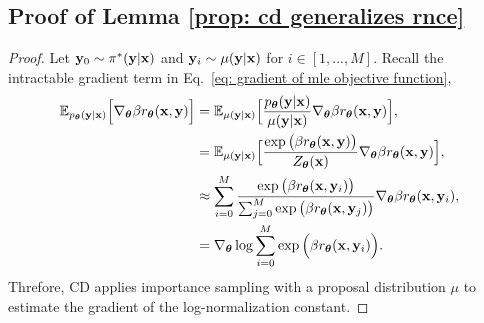 \subsection{Proof of Lemma \ref{prop: cd generalizes rnce}}
\label{sec: cd generalizes rnce}
\cdgeneralizernce*

\begin{proof}
Let $\mathbf{y}_0 \sim \pi^{\ast}(\mathbf{y} | \mathbf{x})$
and
$\mathbf{y}_i \sim \mu(\mathbf{y} | \mathbf{x})$ for $i \in [1,...,M]$.
Recall the intractable gradient term in Eq.~\eqref{eq: gradient of mle objective function},
\begin{align}
\label{eq: cd estimation gradient of log norm constant}
\mathbb{E}_{p_{\boldsymbol\theta}(\mathbf{y} | \mathbf{x})}
\Big[
\nabla_{\boldsymbol\theta} 
\beta
r_{\boldsymbol\theta}(\mathbf{x}, \mathbf{y})
\Big]
& =
\mathbb{E}_{\mu(\mathbf{y} | \mathbf{x})} 
\Big[
\frac{p_{\boldsymbol\theta}(\mathbf{y} | \mathbf{x})} {\mu(\mathbf{y} | \mathbf{x})} 
\nabla_{\boldsymbol\theta} 
\beta
r_{\boldsymbol\theta}(\mathbf{x}, \mathbf{y})
\Big],
\\ \nonumber
& =
\mathbb{E}_{\mu(\mathbf{y} | \mathbf{x})} 
\Big[
\frac{
\exp 
\big(
\beta
r_{\boldsymbol\theta}(\mathbf{x}, \mathbf{y})
\big)
}
{Z_{\boldsymbol\theta}(\mathbf{x})}
\nabla_{\boldsymbol\theta} 
\beta
r_{\boldsymbol\theta}(\mathbf{x}, \mathbf{y})
\Big],
\\ \nonumber
& \approx
\sum_{i=0}^M
\frac{\exp 
\big(
\beta
r_{\boldsymbol\theta}(\mathbf{x}, \mathbf{y}_i)
\big)}
{\sum_{j=0}^M \exp 
\big(
\beta
r_{\boldsymbol\theta}(\mathbf{x}, \mathbf{y}_j)
\big)}
\nabla_{\boldsymbol\theta}
\beta
r_{\boldsymbol\theta}(\mathbf{x}, \mathbf{y}_i)
,
\\ \nonumber
& =
\nabla_{\boldsymbol\theta}
\log
{\sum_{i=0}^M \exp
\Big(
\beta
r_{\boldsymbol\theta}(\mathbf{x}, \mathbf{y}_i)
\Big)}.
\end{align}
Threfore,
CD applies importance sampling with a proposal distribution $\mu$ to estimate the gradient of the log-normalization constant.
\end{proof}


